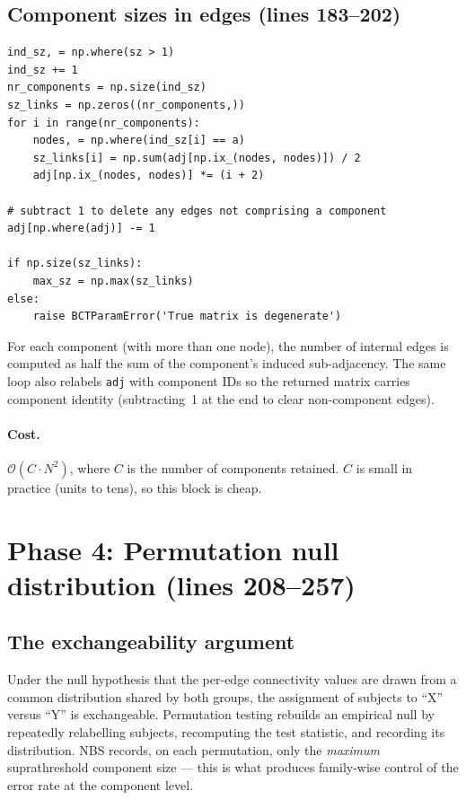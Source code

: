 \documentclass[11pt]{article}
\begin{document}
\subsection{Component sizes in edges (lines 183--202)}

\begin{lstlisting}[firstnumber=183]
ind_sz, = np.where(sz > 1)
ind_sz += 1
nr_components = np.size(ind_sz)
sz_links = np.zeros((nr_components,))
for i in range(nr_components):
    nodes, = np.where(ind_sz[i] == a)
    sz_links[i] = np.sum(adj[np.ix_(nodes, nodes)]) / 2
    adj[np.ix_(nodes, nodes)] *= (i + 2)

# subtract 1 to delete any edges not comprising a component
adj[np.where(adj)] -= 1

if np.size(sz_links):
    max_sz = np.max(sz_links)
else:
    raise BCTParamError('True matrix is degenerate')
\end{lstlisting}

For each component (with more than one node), the number of internal edges is computed as half the sum of the component's induced sub-adjacency. The same loop also relabels \texttt{adj} with component IDs so the returned matrix carries component identity (subtracting~1 at the end to clear non-component edges).

\paragraph{Cost.} $\mathcal{O}(C \cdot N^2)$, where $C$ is the number of components retained. $C$ is small in practice (units to tens), so this block is cheap.

\section{Phase 4: Permutation null distribution (lines 208--257)}

\subsection{The exchangeability argument}

Under the null hypothesis that the per-edge connectivity values are drawn from a common distribution shared by both groups, the assignment of subjects to ``X'' versus ``Y'' is exchangeable. Permutation testing rebuilds an empirical null by repeatedly relabelling subjects, recomputing the test statistic, and recording its distribution. NBS records, on each permutation, only the \emph{maximum} suprathreshold component size --- this is what produces family-wise control of the error rate at the component level.
\end{document}
